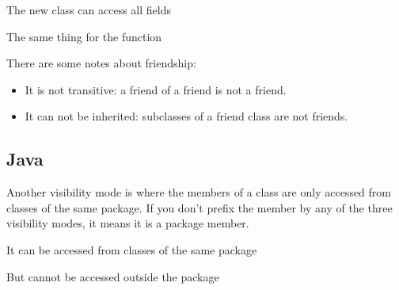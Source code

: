 \documentclass{KodeBook}
\begin{document}


The new class can access all fields 



The same thing for the function



There are some notes about friendship:
\begin{itemize}
	\item It is not transitive: a friend of a friend is not a friend.
	\item It can not be inherited: subclasses of a friend class are not friends.
\end{itemize}

\subsection{Java}

Another visibility mode is  where the members of a class are only accessed from classes of the same package. 
If you don't prefix the member by any of the three visibility modes, it means it is a package member.



It can be accessed from classes of the same package



But cannot be accessed outside the package


\end{document}
